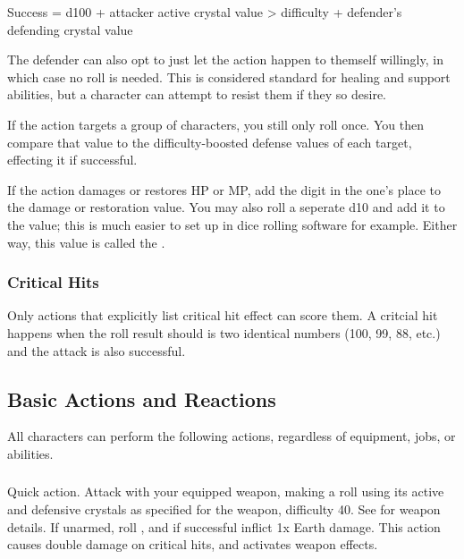 \begin{multicols}{2}
        Success = d100 + attacker active crystal value > difficulty + defender's defending crystal value

        The defender can also opt to just let the action happen to themself willingly, in which case no roll is needed. This is considered standard for healing and support abilities, but a character can attempt to resist them if they so desire.

        If the action targets a group of characters, you still only roll once. You then compare that value to the difficulty-boosted defense values of each target, effecting it if successful.

        If the action damages or restores HP or MP, add the digit in the one's place to the damage or restoration value. You may also roll a seperate d10 and add it to the value; this is much easier to set up in dice rolling software for example. Either way, this value is called the .


        \subsubsection{Critical Hits}
            Only actions that explicitly list critical hit effect can score them. A critcial hit happens when the roll result should is two identical numbers (100, 99, 88, etc.) and the attack is also successful.

    \subsection{Basic Actions and Reactions}\label{subsec:basicactions}
        All characters can perform the following actions, regardless of equipment, jobs, or abilities. 

        \subsubsection{}
            Quick action. Attack with your equipped weapon, making a roll using its active and defensive crystals as specified for the weapon, difficulty 40. See  for weapon details. If unarmed, roll , and if successful inflict 1x Earth damage. This action causes double damage on critical hits, and activates weapon effects.


\end{multicols}
